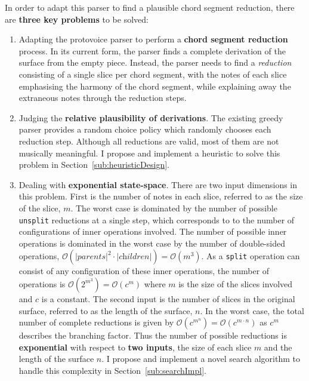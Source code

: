 \documentclass[12pt,a4paper,twoside,openany]{report} \usepackage[pdfborder={0 0 0}]{hyperref}    %
\theoremstyle{definition} \newtheorem{definition}{Definition}[section]
\begin{document}
In order to adapt this parser to find a plausible chord segment reduction, there are \textbf{three key problems} to be solved: 

\begin{enumerate}
  \item Adapting the protovoice parser to perform a \textbf{chord segment reduction} process. In its current form, the
    parser finds a complete derivation of the surface from the empty piece. Instead, the parser needs to find a \textit{reduction}
    consisting of a single slice per chord segment, with the notes of each slice emphasising the
    harmony of the chord segment, while explaining away the extraneous notes through the reduction steps.

  \item Judging the \textbf{relative plausibility of derivations}. The existing greedy parser provides a random choice
    policy which randomly chooses each reduction step. Although all reductions are valid, most of them are not musically
    meaningful. I propose and implement a heuristic to solve this problem in Section~\ref{sub:heuristicDesign}.

  \item Dealing with \textbf{exponential state-space}. There are two input dimensions in this problem. 
    First is the number of notes in each slice, referred to as the size of the slice, $m$.  
    The worst case is dominated by the number of possible \texttt{unsplit} reductions at a single step, which
    corresponds to to the number of configurations of inner operations involved. 
    The number of possible inner operations is dominated in the worst case by the number of double-sided operations, $\mathcal{O}(|\textit{parents}|^2
    \cdot |\textit{children}|) = \mathcal{O}(m^3)$. 
    As a \texttt{split} operation can consist of any configuration of these inner operations, the number of  operations is $\mathcal{O}(2^{m^3})
    = \mathcal{O}(c^m)$ where $m$ is the size of the slices involved and $c$ is a constant.
    The second input is the number of slices in the original surface, referred to as the length of the surface, $n$.
    In the worst case, the total number of complete reductions is given by $\mathcal{O}(c^{m^{n}})
    = \mathcal{O}(c^{m \cdot n})$ as $c^m$ describes the branching factor. Thus the number of possible reductions is
    \textbf{exponential} with respect to \textbf{two inputs}, the size of each slice $m$ and the length of the
    surface $n$. I propose and implement a novel search algorithm to handle this complexity in Section~\ref{sub:searchImpl}.
\end{enumerate}
\end{document}
